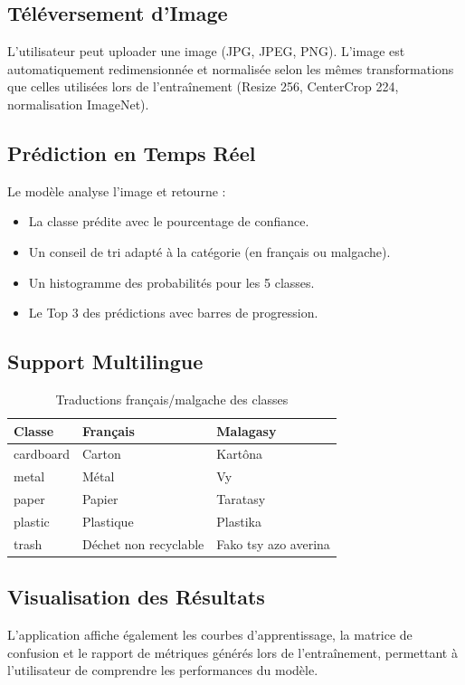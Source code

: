 \documentclass[12pt,a4paper]{report}
\begin{document}
\subsection{Téléversement d'Image}
L'utilisateur peut uploader une image (JPG, JPEG, PNG). L'image est automatiquement redimensionnée et normalisée selon les mêmes transformations que celles utilisées lors de l'entraînement (Resize 256, CenterCrop 224, normalisation ImageNet).

\subsection{Prédiction en Temps Réel}
Le modèle analyse l'image et retourne :
\begin{itemize}
    \item La classe prédite avec le pourcentage de confiance.
    \item Un conseil de tri adapté à la catégorie (en français ou malgache).
    \item Un histogramme des probabilités pour les 5 classes.
    \item Le Top 3 des prédictions avec barres de progression.
\end{itemize}

\subsection{Support Multilingue}
\begin{table}[H]
    \centering
    \caption{Traductions français/malgache des classes}
    \label{tab:bilingual}
    \begin{tabular}{lll}
        \toprule
        \textbf{Classe} & \textbf{Français} & \textbf{Malagasy} \\
        \midrule
        cardboard & Carton & Kartôna \\
        metal & Métal & Vy \\
        paper & Papier & Taratasy \\
        plastic & Plastique & Plastika \\
        trash & Déchet non recyclable & Fako tsy azo averina \\
        \bottomrule
    \end{tabular}
\end{table}

\subsection{Visualisation des Résultats}
L'application affiche également les courbes d'apprentissage, la matrice de confusion et le rapport de métriques générés lors de l'entraînement, permettant à l'utilisateur de comprendre les performances du modèle.
\end{document}
